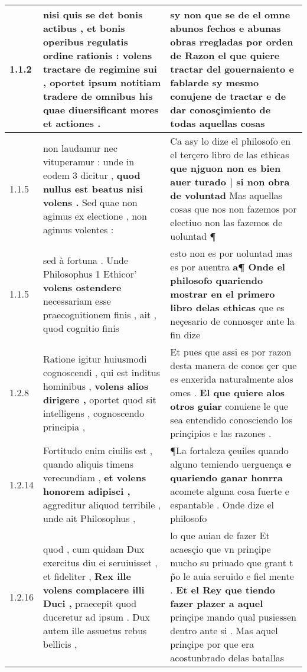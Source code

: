 \begin{tabular}{|p{1cm}|p{6.5cm}|p{6.5cm}|}

\hline
1.1.2 & nisi quis se det bonis actibus , et bonis operibus regulatis ordine rationis : \textbf{ volens tractare de regimine sui , } oportet ipsum notitiam tradere de omnibus his quae diuersificant mores et actiones . & sy non que se de el omne abunos fechos e abunas obras rregladas por orden de Razon \textbf{ el que quiere tractar del gouernaiento } e fablarde sy mesmo conujene de tractar e de dar conosçimiento de todas aquellas cosas \\\hline
1.1.5 & non laudamur nec vituperamur : unde in eodem 3 dicitur , \textbf{ quod nullus est beatus nisi volens . } Sed quae non agimus ex electione , non agimus volentes : & Ca asy lo dize el philosofo en el terçero libro de las ethicas \textbf{ que njguon non es bien auer turado | si non obra de voluntad } Mas aquellas cosas que nos non fazemos por electiuo non las fazemos de uoluntad ¶ \\\hline
1.1.5 & sed à fortuna . Unde Philosophus 1 Ethicor’ \textbf{ volens ostendere } necessariam esse praecognitionem finis , ait , quod cognitio finis & esto non es por uoluntad mas es por auentra \textbf{ a¶ Onde el philosofo quariendo mostrar en el primero libro delas ethicas } que es neçesario de connosçer ante la fin dize \\\hline
1.2.8 & Ratione igitur huiusmodi cognoscendi , qui est inditus hominibus , \textbf{ volens alios dirigere , } oportet quod sit intelligens , cognoscendo principia , & Et pues que assi es por razon desta manera de conos çer que es enxerida naturalmente alos omes . \textbf{ El que quiere alos otros guiar } conuiene le que sea entendido conosciendo los prinçipios e las razones . \\\hline
1.2.14 & Fortitudo enim ciuilis est , quando aliquis timens verecundiam , \textbf{ et volens honorem adipisci , } aggreditur aliquod terribile , unde ait Philosophus , & ¶La fortaleza çeuiles quando alguno temiendo uerguença \textbf{ e quariendo ganar honrra } acomete alguna cosa fuerte e espantable . Onde dize el philosofo \\\hline
1.2.16 & quod , cum quidam Dux exercitus diu ei seruiuisset , et fideliter , \textbf{ Rex ille volens complacere illi Duci , } praecepit quod duceretur ad ipsum . Dux autem ille assuetus rebus bellicis , & lo que auian de fazer Et acaesçio que vn prinçipe mucho su priuado que grant t p̃o le auia seruido e fiel mente . \textbf{ Et el Rey que tiendo fazer plazer a aquel } prinçipe mando qual pusiessen dentro ante si . Mas aquel prinçipe por que era acostunbrado delas batallas \\\hline

\end{tabular}
